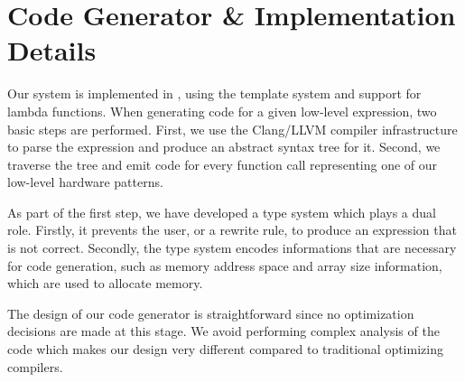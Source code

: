 

\section{Code Generator \& Implementation Details}

Our system is implemented in \Cpp, using the template system and support for lambda functions. 
When generating code for a given low-level expression, two basic steps are performed.
First, we use the Clang/LLVM compiler infrastructure to parse the expression and produce an abstract syntax tree for it.
Second, we traverse the tree and emit code for every function call representing one of our low-level hardware patterns.

As part of the first step, we have developed a type system which plays a dual role.
Firstly, it prevents the user, or a rewrite rule, to produce an expression that is not correct.
Secondly, the type system encodes informations that are necessary for code generation, such as memory address space and array size information, which are used to allocate memory.

The design of our code generator is straightforward since no optimization decisions are made at this stage.
We avoid performing complex analysis of the code which makes our design very different compared to traditional optimizing compilers.


